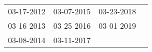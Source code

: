 \begin{supertabular}{llll}
 03-17-2012 &  03-07-2015 &  03-23-2018 \\
 03-16-2013 &  03-25-2016 &  03-01-2019 \\
 03-08-2014 &  03-11-2017 &             \\
\end{supertabular}
